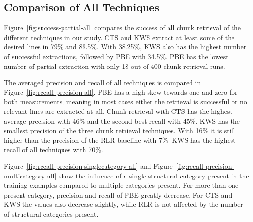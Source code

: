 \documentclass[\myrootdir/main.tex]{subfiles}
\begin{document}

\subsection{Comparison of All Techniques}
Figure~\ref{fig:success-partial-all} compares the success of all chunk retrieval of the different techniques in our study.
CTS and KWS extract at least some of the desired lines in 79\% and 88.5\%.
With 38.25\%, KWS also has the highest number of successful extractions, followed by PBE with 34.5\%.
PBE has the lowest number of partial extraction with only 18 out of 400 chunk retrieval runs.

The averaged precision and recall of all techniques is compared in Figure~\ref{fig:recall-precision-all}.
PBE has a high skew towards one and zero for both measurements, meaning in most cases either the retrieval is successful or no relevant lines are extracted at all.
Chunk retrieval with CTS has the highest average precision with 46\% and the second best recall with 45\%.
KWS has the smallest precision of the three chunk retrieval techniques.
With 16\% it is still higher than the precision of the RLR baseline with 7\%.
KWS has the highest recall of all techniques with 70\%.

Figure~\ref{fig:recall-precision-singlecategory-all} and Figure~\ref{fig:recall-precision-multicategory-all} show the influence of a single structural category present in the training examples compared to multiple categories present.
For more than one present category, precision and recall of PBE greatly decrease.
For CTS and KWS the values also decrease slightly, while RLR is not affected by the number of structural categories present.
\end{document}
